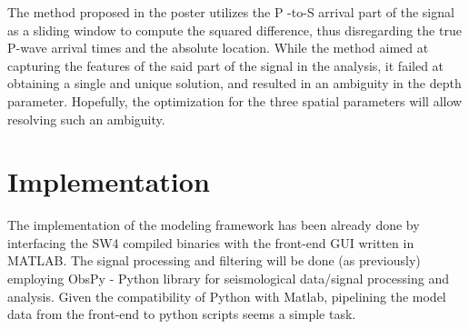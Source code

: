 \documentclass[a4paper,10pt]{article}
\begin{document}
The method proposed in the poster utilizes the P -to-S arrival part of the signal as a sliding window to compute the squared difference, thus disregarding the true P-wave arrival times and the absolute location. While the method aimed at capturing the features of the said part of the signal in the analysis, it failed at obtaining a single and unique solution, and resulted in an ambiguity in the depth parameter. Hopefully, the optimization for the three spatial parameters will allow resolving such an ambiguity.


\section*{Implementation}
The implementation of the modeling framework has been already done by interfacing the SW4 compiled binaries with the front-end GUI written in MATLAB. The signal processing and filtering will be done (as previously) employing ObsPy - Python library for seismological data/signal processing and analysis. Given the compatibility of Python with Matlab, pipelining the model data from the front-end to python scripts seems a simple task.
\end{document}
